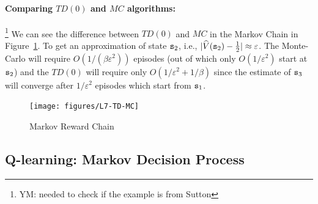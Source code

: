\paragraph{Comparing $TD(0)$ and $MC$ algorithms:}
\footnote{YM: needed to check if the example is from Sutton}
%
We can see the difference between $TD(0)$ and $MC$ in the Markov
Chain in Figure~\ref{fig:L7-TD-MC}. To get an approximation of state
${\tt s}_2$, i.e., $|\widehat{V}({\tt s}_2)-\frac{1}{2}|\approx
\varepsilon$. The Monte-Carlo will require $O(1/(\beta
\varepsilon^2))$ episodes (out of which only $O(1/\varepsilon^2)$
start at ${\tt s}_2$) and the $TD(0)$ will require only
$O(1/\varepsilon^2+1/\beta)$ since the estimate of ${\tt s}_3$ will
converge after $1/\varepsilon^2$ episodes which start from
${\tt s}_1$.

\begin{figure}
  \begin{centering}
  \texttt{[image: figures/L7-TD-MC]}\\
  \caption{Markov Reward Chain}\label{fig:L7-TD-MC}
  \end{centering}
\end{figure}

\subsection{Q-learning: Markov Decision Process}


